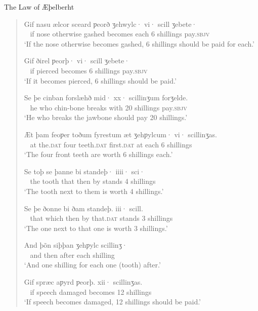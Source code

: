 \begin{texts}{The Law of Æþelberht}
\begin{quote}
     Gif nasu ælcor sceard ƿeorð ʒehwylc· vi· scill ʒebete·\\
    ~ if nose otherwise gashed becomes each 6 shillings pay.\textsc{sbjv}\\\newline
    \trans `If the nose otherwise becomes gashed, 6 shillings should be paid for each.'
    
     Gif ðirel ƿeorþ· vi· scill ʒebete·\\
    ~ if pierced becomes 6 shillings pay.\textsc{sbjv}\\\newline
    \trans `If it becomes pierced, 6 shillings should be paid.'
    
     Se þe cinban forslæhð mid· xx· scillinʒum forʒelde.\\
    ~ he who chin-bone breaks with 20 shillings pay.\textsc{sbjv}\\\newline
    \trans `He who breaks the jawbone should pay 20 shillings.'
    
     Æt þam feoƿer toðum fyrestum æt ʒehƿylcum· vi· scillinʒas.\\
    ~ at the.\textsc{dat} four teeth.\textsc{dat} first.\textsc{dat} at each 6 shillings\\\newline
    \trans `The four front teeth are worth 6 shillings each.'
    
     Se toþ se þanne bi standeþ· iiii· sci·\\
    ~ the tooth that then by stands 4 shillings\\\newline
    \trans `The tooth next to them is worth 4 shillings.'
    
     Se þe ðonne bi ðam standeþ. iii· scill.\\
    ~ that which then by that.\textsc{dat} stands 3 shillings\\\newline
    \trans `The one next to that one is worth 3 shillings.'
    
     And þõn siþþan ʒehƿylc scillinʒ·\\
    ~ and then after each shilling\\\newline
    \trans `And one shilling for each one (tooth) after.'
    
     Gif spræc aƿyrd ƿeorþ. xii· scillinʒas.\\
    ~ if speech damaged becomes 12 shillings\\\newline
    \trans `If speech becomes damaged, 12 shillings should be paid.'
\end{quote}


\end{texts}

